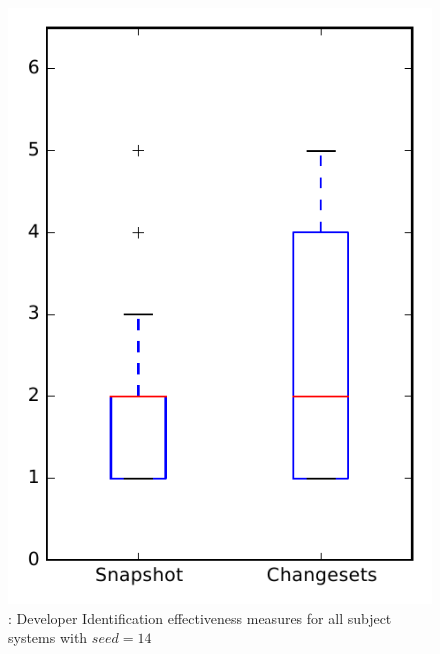 
\begin{figure}
\centering
\includegraphics[height=0.4\textheight]{figures/dit_seed/rq1_overview_14}
\caption{\rtwo: Developer Identification effectiveness measures for all subject systems with $seed=14$}
\label{fig:dit_seed:rq1:overview}
\end{figure}
